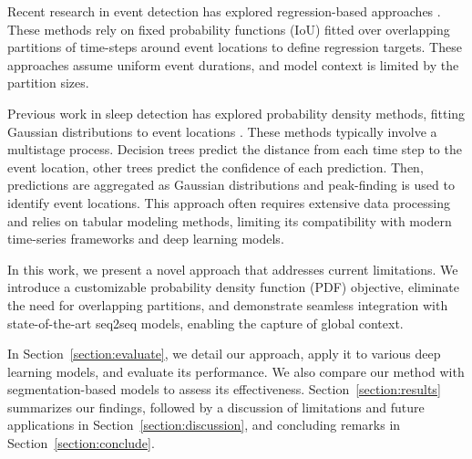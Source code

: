 \documentclass{article}
\begin{document}

Recent research in event detection has explored regression-based approaches \citep{azib2023}. These methods rely on fixed probability functions (IoU) fitted over overlapping partitions of time-steps around event locations to define regression targets. These approaches assume uniform event durations, and model context is limited by the partition sizes.

Previous work in sleep detection has explored probability density methods, fitting Gaussian distributions to event locations \citep{phan2015}. These methods typically involve a multistage process. Decision trees predict the distance from each time step to the event location, other trees predict the confidence of each prediction. Then, predictions are aggregated as Gaussian distributions and peak-finding is used to identify event locations. This approach often requires extensive data processing and relies on tabular modeling methods, limiting its compatibility with modern time-series frameworks and deep learning models.

In this work, we present a novel approach that addresses current limitations. We introduce a customizable probability density function (PDF) objective, eliminate the need for overlapping partitions, and demonstrate seamless integration with state-of-the-art seq2seq models, enabling the capture of global context. 

In Section~\ref{section:evaluate}, we detail our approach, apply it to various deep learning models, and evaluate its performance. We also compare our method with segmentation-based models to assess its effectiveness. Section~\ref{section:results} summarizes our findings, followed by a discussion of limitations and future applications in Section~\ref{section:discussion}, and concluding remarks in Section~\ref{section:conclude}.
\end{document}
